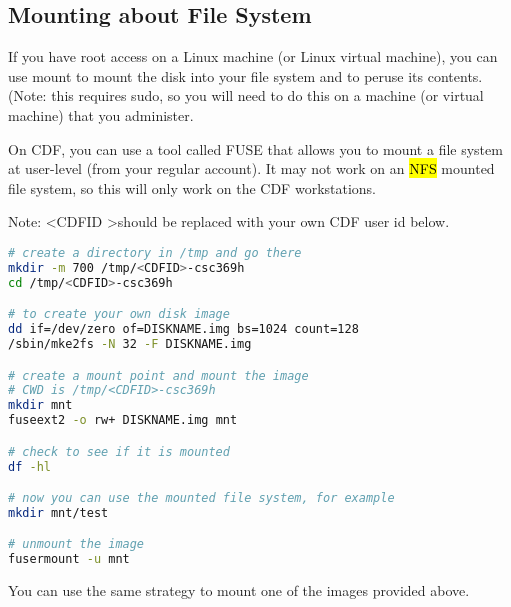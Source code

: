 \documentclass[12pt]{article}
\begin{document}
\bigskip

\subsection{Mounting about File System}

\bigskip

If you have root access on a Linux machine (or Linux virtual machine), you can
use mount to mount the disk into your file system and to peruse its contents.
(Note: this requires sudo, so you will need to do this on a machine (or virtual
machine) that you administer.

\bigskip

On CDF, you can use a tool called FUSE that allows you to mount a file system at
user-level (from your regular account). It may not work on an \hl{NFS} mounted file
system, so this will only work on the CDF workstations.

\bigskip

Note: \textless CDFID \textgreater should be replaced with your own CDF user id below.


\begin{lstlisting}[language=bash]
# create a directory in /tmp and go there
mkdir -m 700 /tmp/<CDFID>-csc369h
cd /tmp/<CDFID>-csc369h

# to create your own disk image
dd if=/dev/zero of=DISKNAME.img bs=1024 count=128
/sbin/mke2fs -N 32 -F DISKNAME.img

# create a mount point and mount the image
# CWD is /tmp/<CDFID>-csc369h
mkdir mnt
fuseext2 -o rw+ DISKNAME.img mnt

# check to see if it is mounted
df -hl

# now you can use the mounted file system, for example
mkdir mnt/test

# unmount the image
fusermount -u mnt
\end{lstlisting}

\bigskip

You can use the same strategy to mount one of the images provided above.
\end{document}
